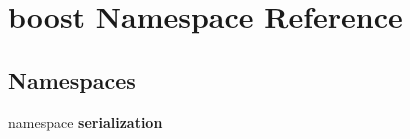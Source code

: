 \section{boost Namespace Reference}
\label{d4/da9/namespaceboost}
\subsection*{Namespaces}
\begin{DoxyCompactItemize}
\item 
namespace {\bf serialization}
\end{DoxyCompactItemize}
